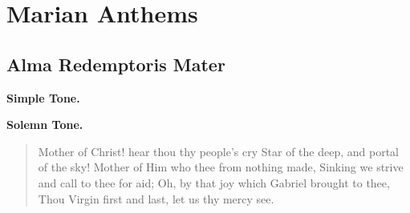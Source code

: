 \chapter{Marian Anthems}
{
\def\nogabcbreaks{T}
\newcommand{\printsimpletone}{
\vspace{0ex plus 0ex minus 1ex}
\needspace{3\baselineskip}
\begin{center}\textbf{Simple Tone.}\end{center}
\vspace{0ex plus 0ex minus 1ex}
}
\newcommand{\printsolemntone}{
\oldneedspace{3\baselineskip}
\begin{center}\textbf{Solemn Tone.}\end{center}
\vspace{0ex plus 0ex minus 1ex}
}
\newcommand{\afterant}{
\ifx\note\undefined\else%
\textit{\note}

\smallskip
\fi
\sloppy
\begin{columns}
\versicle{\vlatin}{\venglish}
\response{\rlatin}{\renglish}
\colchunk{}
\colplacechunks{}
\colchunk{\hspace*{3em}Orémus.}\colchunk{\hspace*{3em}Let us pray,}
\colplacechunks{}
\prayer{\prayerlatin}{\prayerenglish}
\end{columns}
\ifx\notetwo\undefined\else%
\medskip

\needspace{2\baselineskip}
\textit{\notetwo}

\smallskip
\begin{columns}
\versicle{\vlatintwo}{\venglishtwo}
\response{\rlatintwo}{\renglishtwo}
\colchunk{}
\colplacechunks{}
\colchunk{\hspace*{3em}Orémus.}\colchunk{\hspace*{3em}Let us pray,}
\colplacechunks{}
\prayer{\prayerlatintwo}{\prayerenglishtwo}
\end{columns}
\fi
}

\def\gabcfolder{../MarianAntiphons}

\section{Alma Redemptoris Mater}
\printsimpletone{}
\printsolemntone{}
\begin{quote}{Mother of Christ! hear thou thy people's cry
Star of the deep, and portal of the sky!
Mother of Him who thee from nothing made,
Sinking we strive and call to thee for aid;
Oh, by that joy which Gabriel brought to thee,
Thou Virgin first and last, let us thy mercy see.}\end{quote}

}
